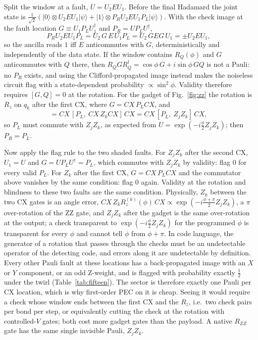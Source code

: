 \documentclass[11pt,a4paper]{article}
\theoremstyle{remark}
\begin{document}
Split the window at a fault, $U=U_2EU_1$. Before the final Hadamard the joint state is $\tfrac1{\sqrt2}(|0\rangle\otimes U_2EU_1|\psi\rangle+|1\rangle\otimes P_RU_2EU_1P_L|\psi\rangle)$. With the check image at the fault location $G\equiv U_1P_LU_1^\dagger$ and $P_R=UP_LU^\dagger$,
\begin{equation}
P_RU_2EU_1P_L=U_2\,G\,E\,U_1P_L=U_2\,GEG\,U_1=\pm U_2EU_1,
\end{equation}
so the ancilla reads $1$ iff $E$ anticommutes with $G$, deterministically and independently of the data state. If the window contains $R_Q(\phi)$ and $G$ anticommutes with $Q$ there, then $R_QGR_Q^\dagger=\cos\phi\,G+i\sin\phi\,GQ$ is not a Pauli: no $P_R$ exists, and using the Clifford-propagated image instead makes the noiseless circuit flag with a state-dependent probability $\propto\sin^2\phi$. Validity therefore requires $[G,Q]=0$ at the rotation. For the gadget of Fig.~\ref{fig:zz} the rotation is $R_z$ on $q_k$ after the first CX, where $G=CX\,P_LCX$, and
\begin{equation}
[CX\,P_LCX,\ Z_k]=CX\,[P_L,\ CX\,Z_kCX]\,CX=CX\,[P_L,\ Z_jZ_k]\,CX,
\end{equation}
so $P_L$ must commute with $Z_jZ_k$, as expected from $U=\exp(-i\frac\phi2Z_jZ_k)$; then $P_R=P_L$.

Now apply the flag rule to the two shaded faults. For $Z_jZ_k$ after the second CX, $U_1=U$ and $G=UP_LU^\dagger=P_L$, which commutes with $Z_jZ_k$ by validity: flag $0$ for every valid $P_L$. For $Z_k$ after the first CX, $G=CX\,P_LCX$ and the commutator above vanishes by the same condition: flag $0$ again. Validity at the rotation and blindness to these two faults are the same condition. Physically, $Z_k$ between the two CX gates is an angle error, $CX\,Z_kR_z^{(k)}(\phi)\,CX\propto\exp(-i\frac{\phi+\pi}2Z_jZ_k)$, a $\pi$ over-rotation of the ZZ gate, and $Z_jZ_k$ after the gadget is the same over-rotation at the output; a check transparent to $\exp(-i\frac\phi2Z_jZ_k)$ for the programmed $\phi$ is transparent for every $\phi$ and cannot tell $\phi$ from $\phi+\pi$. In code language, the generator of a rotation that passes through the checks must be an undetectable operator of the detecting code, and errors along it are undetectable by definition. Every other Pauli fault at these locations has a back-propagated image with an $X$ or $Y$ component, or an odd Z-weight, and is flagged with probability exactly $\tfrac12$ under the twirl (Table~\ref{tab:fifteen}). The sector is therefore exactly one Pauli per CX location, which is why first-order PEC on it is cheap. Seeing it would require a check whose window ends between the first CX and the $R_z$, i.e.\ two check pairs per bond per step, or equivalently cutting the check at the rotation with controlled-$V$ gates; both cost more gadget gates than the payload. A native $R_{ZZ}$ gate has the same single invisible Pauli, $Z_jZ_k$.
\end{document}
